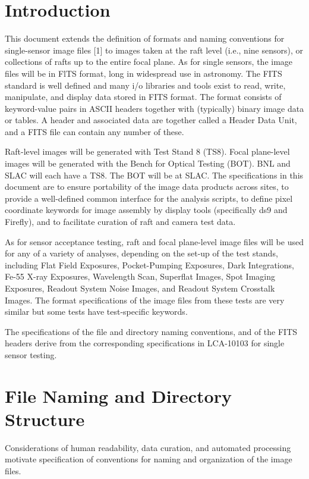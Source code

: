 \documentclass{article}[12pt]
\begin{document}
\section{Introduction}
This document extends the definition of formats and naming conventions for single-sensor image files [1] to images taken at the raft level (i.e., nine sensors), or collections of rafts up to the entire focal plane.  As for single sensors, the image files will be in FlTS format, long in widespread use in astronomy.  The FITS standard is well defined and many i/o libraries and tools exist to read, write, manipulate, and display data stored in FITS format.  The format consists of keyword-value pairs in ASCII headers together with (typically) binary image data or tables.  A header and associated data are together called a Header Data Unit, and a FITS file can contain any number of these.

Raft-level images will be generated with Test Stand 8 (TS8).  Focal plane-level images will be generated with the Bench for Optical Testing (BOT).  BNL and SLAC will each have a TS8.  The BOT will be at SLAC.  The specifications in this document are to ensure portability of the image data products across sites, to provide a well-defined common interface for the analysis scripts, to define pixel coordinate keywords for image assembly by display tools (specifically ds9 and Firefly), and to facilitate curation of raft and camera test data.

As for sensor acceptance testing, raft and focal plane-level image files will be used for any of a variety of analyses, depending on the set-up of the test stands, including Flat Field Exposures, Pocket-Pumping Exposures, Dark Integrations, Fe-55 X-ray Exposures, Wavelength Scan, Superflat Images, Spot Imaging Exposures, Readout System Noise Images, and Readout System Crosstalk Images.
The format specifications of the image files from these tests are very similar but some tests have test-specific keywords.  

The specifications of the file and directory naming conventions, and of the FITS headers derive from the corresponding specifications in LCA-10103 for single sensor testing.

\section{File Naming and Directory Structure}
Considerations of human readability, data curation, and automated processing motivate specification of conventions for naming and organization of the image files.
\end{document}
